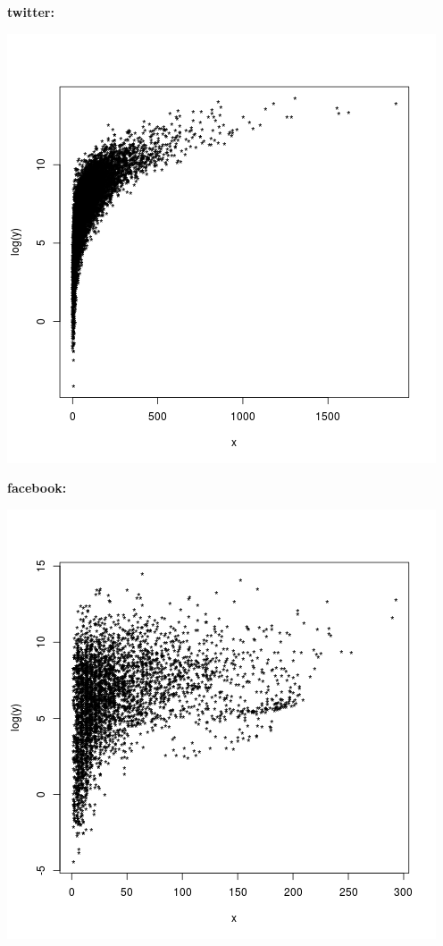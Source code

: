 \documentclass[palatino,nochap]{apuntes}
\begin{document}
\textbf{twitter:}

\begin{center}
	\includegraphics[scale=0.45]{img/twitter_grado-betweeness}
\end{center}


\textbf{facebook:}

\begin{center}
	\includegraphics[scale=0.45]{img/fb_grado-betweeness}
\end{center}
\end{document}
